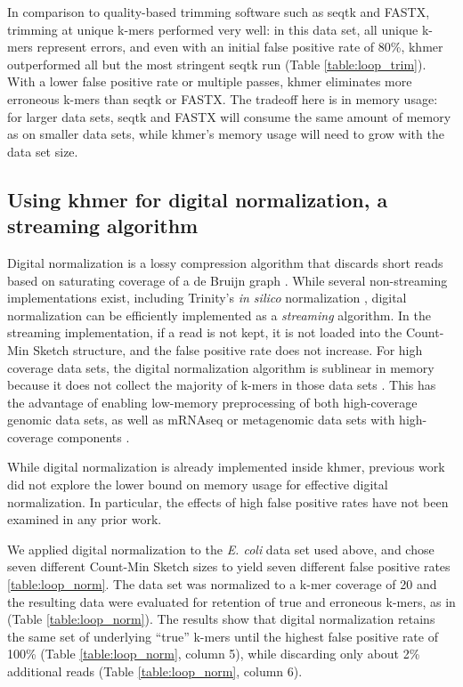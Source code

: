 \documentclass[10pt]{article}
\begin{document}
In comparison to quality-based trimming software such as seqtk and
FASTX, trimming at unique k-mers performed very well: in this data
set, all unique k-mers represent errors, and even with an initial
false positive rate of 80\%, khmer outperformed all but the most
stringent seqtk run (Table \ref{table:loop_trim}).  With a lower false
positive rate or multiple passes, khmer eliminates more erroneous
k-mers than seqtk or FASTX.  The tradeoff here is in memory usage:
for larger data sets, seqtk and FASTX will consume
the same amount of memory as on smaller data sets, while khmer's memory
usage will need to grow with the data set size.

\subsection*{Using khmer for digital normalization, a streaming algorithm}

Digital normalization is a lossy compression algorithm that discards
short reads based on saturating coverage of a de Bruijn graph
\cite{Brown2012}.  While several non-streaming implementations exist,
including Trinity's {\em in silico} normalization
\cite{Haas2013,Brown2012blog}, digital normalization can be
efficiently implemented as a {\em streaming} algorithm. In the
streaming implementation, if a read is not kept, it is not loaded into
the Count-Min Sketch structure, and the false positive rate does not
increase.  For high coverage data sets, the digital normalization
algorithm is sublinear in memory because it does not collect the
majority of k-mers in those data sets \cite{Brown2012}.  This has the
advantage of enabling low-memory preprocessing of both high-coverage
genomic data sets, as well as mRNAseq or metagenomic data sets with
high-coverage components \cite{Brown2012, Howe2012}.

While digital normalization is already implemented inside khmer,
previous work did not explore the lower bound on memory usage for
effective digital normalization.  In particular, the effects of high
false positive rates have not been examined in any prior work.

We applied digital normalization to the {\em E. coli} data set used
above, and chose seven different Count-Min Sketch sizes to yield seven
different false positive rates \ref{table:loop_norm}.  The data set
was normalized to a k-mer coverage of 20 and the resulting data were
evaluated for retention of true and erroneous k-mers, as in
\cite{Brown2012} (Table \ref{table:loop_norm}).  The results show that
digital normalization retains the same set of underlying ``true''
k-mers until the highest false positive rate of 100\% (Table
\ref{table:loop_norm}, column 5), while discarding only about 2\%
additional reads (Table \ref{table:loop_norm}, column 6).
\end{document}
